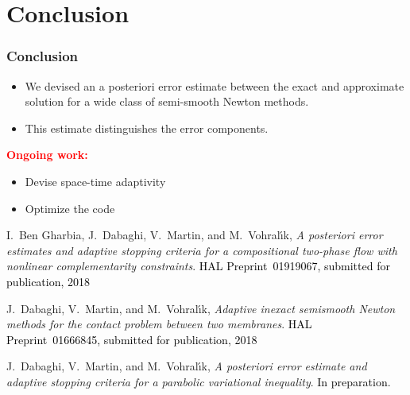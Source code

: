 \documentclass[10 pt]{beamer}
\begin{document}
\section{Conclusion}
\begin{frame}
\frametitle{Conclusion}
\begin{itemize}
\item
We devised an a posteriori error estimate between the exact and approximate solution for a wide class of semi-smooth Newton methods.
\vspace{0.5 cm}
\item 
This estimate distinguishes the error components.
\end{itemize}
\vspace{0.5 cm}
\textcolor{red}{\textbf{Ongoing work:}}
\begin{itemize}
\item
 Devise space-time adaptivity 
\item Optimize the code
\end{itemize}
\vspace{0.5 cm}
\begin{thebibliography}{10}
 \scriptsize{
 {\sc I.~Ben Gharbia, J.~Dabaghi, V.~Martin, and M.~Vohral{\'{\i}}k}, {\em A posteriori error estimates and adaptive stopping criteria for a compositional two-phase flow with nonlinear complementarity constraints}.
 \textcolor{black}{HAL Preprint~01919067, submitted for publication, 2018}}

 \scriptsize{
 {\sc J.~Dabaghi, V.~Martin, and M.~Vohral{\'{\i}}k}, {\em Adaptive inexact
  semismooth Newton methods for the contact problem between two membranes}.
 \textcolor{black}{HAL Preprint~01666845, submitted for publication, 2018}
 }

 \scriptsize{
 {\sc J.~Dabaghi, V.~Martin, and M.~Vohral{\'{\i}}k}, {\em A posteriori error estimate and adaptive stopping criteria for a parabolic variational inequality}.
 \textcolor{black}{In preparation.}
 }


 \end{thebibliography}


\end{frame}
\end{document}
